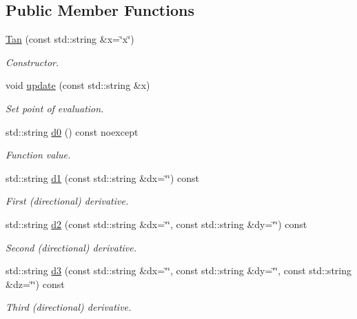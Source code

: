 \subsection*{Public Member Functions}
\begin{DoxyCompactItemize}
\item 
\hyperlink{structFunG_1_1texify_1_1Tan_ace9922f66084ff3db77450cfe1e57a9a}{Tan} (const std\-::string \&x=\char`\"{}x\char`\"{})
\begin{DoxyCompactList}\small\item\em Constructor. \end{DoxyCompactList}\item 
void \hyperlink{structFunG_1_1texify_1_1Tan_a4d8ad1e55544299da0d132159ec77ce3}{update} (const std\-::string \&x)
\begin{DoxyCompactList}\small\item\em Set point of evaluation. \end{DoxyCompactList}\item 
std\-::string \hyperlink{structFunG_1_1texify_1_1Tan_a4a8538555fc86b57b5748b2c9930dac5}{d0} () const noexcept
\begin{DoxyCompactList}\small\item\em Function value. \end{DoxyCompactList}\item 
std\-::string \hyperlink{structFunG_1_1texify_1_1Tan_a1cbfd9653f3f0f7eaff6a7a374a90a10}{d1} (const std\-::string \&dx=\char`\"{}\char`\"{}) const 
\begin{DoxyCompactList}\small\item\em First (directional) derivative. \end{DoxyCompactList}\item 
std\-::string \hyperlink{structFunG_1_1texify_1_1Tan_a65c73910c41e6a12a00b62b8ecdb0ce2}{d2} (const std\-::string \&dx=\char`\"{}\char`\"{}, const std\-::string \&dy=\char`\"{}\char`\"{}) const 
\begin{DoxyCompactList}\small\item\em Second (directional) derivative. \end{DoxyCompactList}\item 
std\-::string \hyperlink{structFunG_1_1texify_1_1Tan_a3e4520b428c220a589a77d975e1f65c9}{d3} (const std\-::string \&dx=\char`\"{}\char`\"{}, const std\-::string \&dy=\char`\"{}\char`\"{}, const std\-::string \&dz=\char`\"{}\char`\"{}) const 
\begin{DoxyCompactList}\small\item\em Third (directional) derivative. \end{DoxyCompactList}\end{DoxyCompactItemize}


